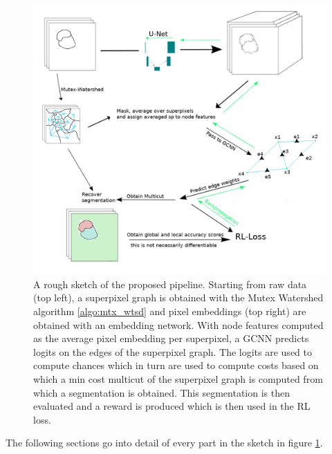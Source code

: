 \begin{figure}[ht!]
	\centering
	\includegraphics[width=1\textwidth]{figures/images/sketch_overall.png}
	\caption{A rough sketch of the proposed pipeline. Starting from raw data (top left), a superpixel graph is obtained with the Mutex Watershed algorithm \ref{algo:mtx_wtsd} and pixel embeddings (top right) are obtained with an embedding network. With node features computed as the average pixel embedding per superpixel, a GCNN predicts logits on the edges of the superpixel graph. The logits are used to compute chances which in turn are used to compute costs based on which a min cost multicut of the superpixel graph is computed from which a segmentation is obtained. This segmentation is then evaluated and a reward is produced which is then used in the RL loss.}
	\label{overview}
\end{figure}


The following sections go into detail of every part in the sketch in figure \ref{overview}.